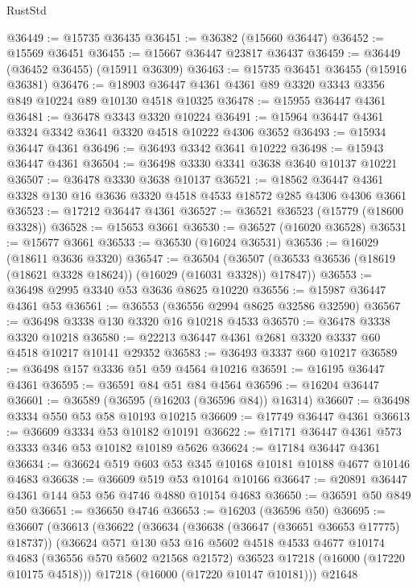 \begin{lexlean}{RustStd}
\begin{coremodule}
@36449 := @15735 @36435
@36451 := @36382 (@15660 @36447)
@36452 := @15569 @36451
@36455 := @15667 @36447 @23817 @36437
@36459 := @36449 (@36452 @36455) (@15911 @36309)
@36463 := @15735 @36451 @36455 (@15916 @36381)
@36476 := @18903 @36447 @4361 @4361 @89 @3320 @3343 @3356 @849 @10224 @89 @10130 @4518 @10325
@36478 := @15955 @36447 @4361
@36481 := @36478 @3343 @3320 @10224
@36491 := @15964 @36447 @4361 @3324 @3342 @3641 @3320 @4518 @10222 @4306 @3652
@36493 := @15934 @36447 @4361
@36496 := @36493 @3342 @3641 @10222
@36498 := @15943 @36447 @4361
@36504 := @36498 @3330 @3341 @3638 @3640 @10137 @10221
@36507 := @36478 @3330 @3638 @10137
@36521 := @18562 @36447 @4361 @3328 @130 @16 @3636 @3320 @4518 @4533 @18572 @285 @4306 @4306 @3661
@36523 := @17212 @36447 @4361
@36527 := @36521 @36523 (@15779 (@18600 @3328))
@36528 := @15653 @3661
@36530 := @36527 (@16020 @36528)
@36531 := @15677 @3661
@36533 := @36530 (@16024 @36531)
@36536 := @16029 (@18611 @3636 @3320)
@36547 := @36504
    (@36507 (@36533 @36536 (@18619 (@18621 @3328 @18624)) (@16029 (@16031 @3328)) @17847))
@36553 := @36498 @2995 @3340 @53 @3636 @8625 @10220
@36556 := @15987 @36447 @4361 @53
@36561 := @36553 (@36556 @2994 @8625 @32586 @32590)
@36567 := @36498 @3338 @130 @3320 @16 @10218 @4533
@36570 := @36478 @3338 @3320 @10218
@36580 := @22213 @36447 @4361 @2681 @3320 @3337 @60 @4518 @10217 @10141 @29352
@36583 := @36493 @3337 @60 @10217
@36589 := @36498 @157 @3336 @51 @59 @4564 @10216
@36591 := @16195 @36447 @4361
@36595 := @36591 @84 @51 @84 @4564
@36596 := @16204 @36447
@36601 := @36589 (@36595 (@16203 (@36596 @84)) @16314)
@36607 := @36498 @3334 @550 @53 @58 @10193 @10215
@36609 := @17749 @36447 @4361
@36613 := @36609 @3334 @53 @10182 @10191
@36622 := @17171 @36447 @4361 @573 @3333 @346 @53 @10182 @10189 @5626
@36624 := @17184 @36447 @4361
@36634 := @36624 @519 @603 @53 @345 @10168 @10181 @10188 @4677 @10146 @4683
@36638 := @36609 @519 @53 @10164 @10166
@36647 := @20891 @36447 @4361 @144 @53 @56 @4746 @4880 @10154 @4683
@36650 := @36591 @50 @849 @50
@36651 := @36650 @4746
@36653 := @16203 (@36596 @50)
@36695 := @36607
    (@36613
      (@36622
        (@36634
          (@36638 (@36647 (@36651 @36653 @17775) @18737))
          (@36624
            @571
            @130
            @53
            @16
            @5602
            @4518
            @4533
            @4677
            @10174
            @4683
            (@36556 @570 @5602 @21568 @21572)
            @36523
            @17218
            (@16000 (@17220 @10175 @4518)))
          @17218
          (@16000 (@17220 @10147 @10181)))
        @21648

\end{coremodule}
\end{lexlean}
